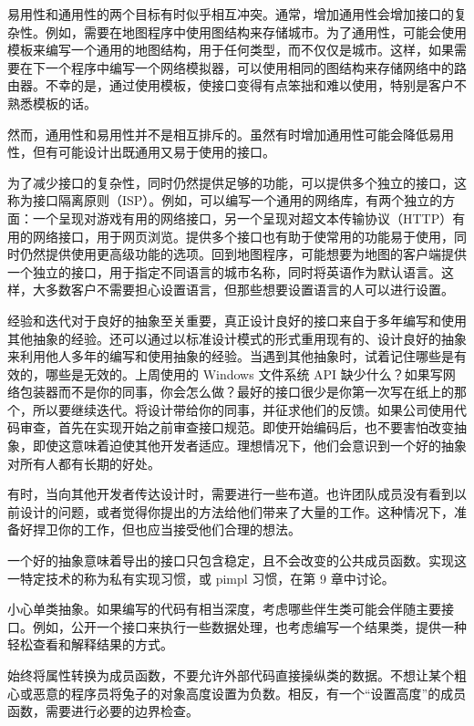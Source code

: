 易用性和通用性的两个目标有时似乎相互冲突。通常，增加通用性会增加接口的复杂性。例如，需要在地图程序中使用图结构来存储城市。为了通用性，可能会使用模板来编写一个通用的地图结构，用于任何类型，而不仅仅是城市。这样，如果需要在下一个程序中编写一个网络模拟器，可以使用相同的图结构来存储网络中的路由器。不幸的是，通过使用模板，使接口变得有点笨拙和难以使用，特别是客户不熟悉模板的话。

然而，通用性和易用性并不是相互排斥的。虽然有时增加通用性可能会降低易用性，但有可能设计出既通用又易于使用的接口。

为了减少接口的复杂性，同时仍然提供足够的功能，可以提供多个独立的接口，这称为接口隔离原则（ISP）。例如，可以编写一个通用的网络库，有两个独立的方面：一个呈现对游戏有用的网络接口，另一个呈现对超文本传输协议（HTTP）有用的网络接口，用于网页浏览。提供多个接口也有助于使常用的功能易于使用，同时仍然提供使用更高级功能的选项。回到地图程序，可能想要为地图的客户端提供一个独立的接口，用于指定不同语言的城市名称，同时将英语作为默认语言。这样，大多数客户不需要担心设置语言，但那些想要设置语言的人可以进行设置。


经验和迭代对于良好的抽象至关重要，真正设计良好的接口来自于多年编写和使用其他抽象的经验。还可以通过以标准设计模式的形式重用现有的、设计良好的抽象来利用他人多年的编写和使用抽象的经验。当遇到其他抽象时，试着记住哪些是有效的，哪些是无效的。上周使用的 Windows 文件系统 API 缺少什么？如果写网络包装器而不是你的同事，你会怎么做？最好的接口很少是你第一次写在纸上的那个，所以要继续迭代。将设计带给你的同事，并征求他们的反馈。如果公司使用代码审查，首先在实现开始之前审查接口规范。即使开始编码后，也不要害怕改变抽象，即使这意味着迫使其他开发者适应。理想情况下，他们会意识到一个好的抽象对所有人都有长期的好处。

有时，当向其他开发者传达设计时，需要进行一些布道。也许团队成员没有看到以前设计的问题，或者觉得你提出的方法给他们带来了大量的工作。这种情况下，准备好捍卫你的工作，但也应当接受他们合理的想法。

一个好的抽象意味着导出的接口只包含稳定，且不会改变的公共成员函数。实现这一特定技术的称为私有实现习惯，或 pimpl 习惯，在第 9 章中讨论。

小心单类抽象。如果编写的代码有相当深度，考虑哪些伴生类可能会伴随主要接口。例如，公开一个接口来执行一些数据处理，也考虑编写一个结果类，提供一种轻松查看和解释结果的方式。

始终将属性转换为成员函数，不要允许外部代码直接操纵类的数据。不想让某个粗心或恶意的程序员将兔子的对象高度设置为负数。相反，有一个“设置高度”的成员函数，需要进行必要的边界检查。

